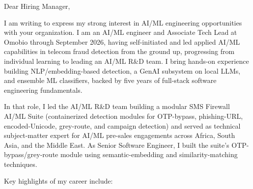 \documentclass[11pt]{article}
\begin{document}

Dear Hiring Manager,

I am writing to express my strong interest in AI/ML engineering opportunities with your organization. I am an AI/ML engineer and Associate Tech Lead at Omobio through September 2026, having self-initiated and led applied AI/ML capabilities in telecom fraud detection from the ground up, progressing from individual learning to leading an AI/ML R\&D team. I bring hands-on experience building NLP/embedding-based detection, a GenAI subsystem on local LLMs, and ensemble ML classifiers, backed by five years of full-stack software engineering fundamentals.

In that role, I led the AI/ML R\&D team building a modular SMS Firewall AI/ML Suite (containerized detection modules for OTP-bypass, phishing-URL, encoded-Unicode, grey-route, and campaign detection) and served as technical subject-matter expert for AI/ML pre-sales engagements across Africa, South Asia, and the Middle East. As Senior Software Engineer, I built the suite's OTP-bypass/grey-route module using semantic-embedding and similarity-matching techniques.

Key highlights of my career include:

\begin{clitems}
  \item {}
  \item {}
  \item {}
  \item {}
\end{clitems}
\end{document}

